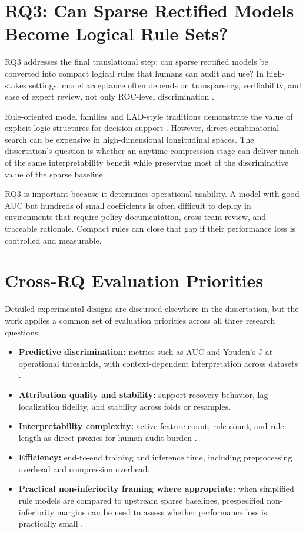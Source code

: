\section{RQ3: Can Sparse Rectified Models Become Logical Rule Sets?}

RQ3 addresses the final translational step: can sparse rectified models be converted into compact logical rules that humans can audit and use? In high-stakes settings, model acceptance often depends on transparency, verifiability, and ease of expert review, not only ROC-level discrimination \autocites{CRudin2019Stop,WJMurdoch2019Definitions}.

Rule-oriented model families and LAD-style traditions demonstrate the value of explicit logic structures for decision support \autocites{EBoros1997Logical,EBoros2000implementation,EAngelino2018Learning}. However, direct combinatorial search can be expensive in high-dimensional longitudinal spaces. The dissertation's question is whether an anytime compression stage can deliver much of the same interpretability benefit while preserving most of the discriminative value of the sparse baseline \autocite{JOrender2025Anytime}.

RQ3 is important because it determines operational usability. A model with good AUC but hundreds of small coefficients is often difficult to deploy in environments that require policy documentation, cross-team review, and traceable rationale. Compact rules can close that gap if their performance loss is controlled and measurable.

\section{Cross-RQ Evaluation Priorities}

Detailed experimental designs are discussed elsewhere in the dissertation, but the work applies a common set of evaluation priorities across all three research questions:
\begin{itemize}
    \item \textbf{Predictive discrimination:} metrics such as AUC and Youden's J at operational thresholds, with context-dependent interpretation across datasets \autocites{JOrender2025Efficient,shin2020,sigillito1989}.
    \item \textbf{Attribution quality and stability:} support recovery behavior, lag localization fidelity, and stability across folds or resamples.
    \item \textbf{Interpretability complexity:} active-feature count, rule count, and rule length as direct proxies for human audit burden \autocites{WJMurdoch2019Definitions,EAngelino2018Learning}.
    \item \textbf{Efficiency:} end-to-end training and inference time, including preprocessing overhead and compression overhead.
    \item \textbf{Practical non-inferiority framing where appropriate:} when simplified rule models are compared to upstream sparse baselines, prespecified non-inferiority margins can be used to assess whether performance loss is practically small \autocite{DJSchuirmann1987comparison}.
\end{itemize}

